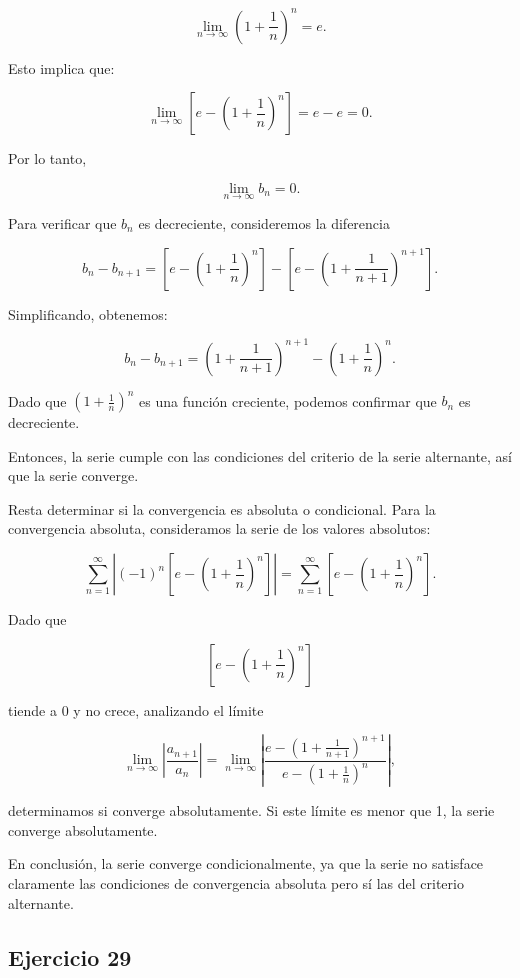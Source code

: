\documentclass{article}
\begin{document}
    $$
    \lim_{n \to \infty} \left(1 + \frac{1}{n}\right)^n = e.
    $$

    Esto implica que:

    $$
    \lim_{n \to \infty} \left[e - \left(1 + \frac{1}{n}\right)^n\right] = e - e = 0.
    $$

    Por lo tanto,

    $$\lim_{n \to \infty} b_n = 0.$$

    Para verificar que \(b_n\) es decreciente, consideremos la diferencia

    $$b_n - b_{n+1} = \left[e - \left(1 + \frac{1}{n}\right)^n \right] - \left[e - \left(1 + \frac{1}{n+1}\right)^{n+1} \right].$$

    Simplificando, obtenemos:

    $$
    b_n - b_{n+1} = \left(1 + \frac{1}{n+1}\right)^{n+1} - \left(1 + \frac{1}{n}\right)^n.
    $$

    Dado que \( \left(1 + \frac{1}{n}\right)^n \) es una función creciente, podemos confirmar que \(b_n\) es decreciente.

    Entonces, la serie cumple con las condiciones del criterio de la serie alternante, así que la serie converge.

    Resta determinar si la convergencia es absoluta o condicional. Para la convergencia absoluta, consideramos la serie de los valores absolutos:

    $$
    \sum_{n=1}^{\infty} \left|(-1)^n \left[e - \left(1 + \frac{1}{n}\right)^n \right]\right| = \sum_{n=1}^{\infty} \left[e - \left(1 + \frac{1}{n}\right)^n \right].
    $$

    Dado que

    $$\left[e - \left(1 + \frac{1}{n}\right)^n \right]$$

    tiende a 0 y no crece, analizando el límite

    $$
    \lim _{n \rightarrow \infty}\left|\frac{a_{n+1}}{a_{n}}\right| = \lim _{n \rightarrow \infty}\left|\frac{e - \left(1 + \frac{1}{n+1}\right)^{n+1}}{e - \left(1 + \frac{1}{n}\right)^n}\right|,
    $$

    determinamos si converge absolutamente. Si este límite es menor que 1, la serie converge absolutamente.

    En conclusión, la serie converge condicionalmente, ya que la serie no satisface claramente las condiciones de convergencia absoluta pero sí las del criterio alternante.



    \subsection*{Ejercicio 29}
\end{document}
